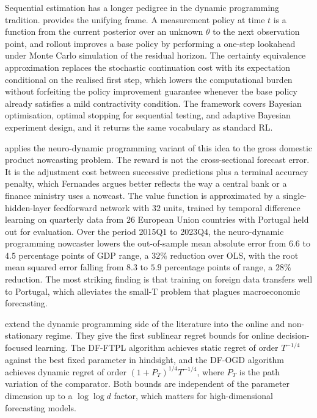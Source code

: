 Sequential estimation has a longer pedigree in the dynamic programming tradition.
\citet{BertsekasRollout2022} provides the unifying frame. A measurement policy at
time $t$ is a function from the current posterior over an unknown $\theta$ to the
next observation point, and rollout improves a base policy by performing a one-step
lookahead under Monte Carlo simulation of the residual horizon. The certainty
equivalence approximation replaces the stochastic continuation cost with its
expectation conditional on the realised first step, which lowers the computational
burden without forfeiting the policy improvement guarantee whenever the base policy
already satisfies a mild contractivity condition. The framework covers Bayesian
optimisation, optimal stopping for sequential testing, and adaptive Bayesian
experiment design, and it returns the same vocabulary as standard RL.

\citet{Fernandes2024} applies the neuro-dynamic programming variant of this idea to
the gross domestic product nowcasting problem. The reward is not the cross-sectional
forecast error. It is the adjustment cost between successive predictions plus a
terminal accuracy penalty, which Fernandes argues better reflects the way a central
bank or a finance ministry uses a nowcast. The value function is approximated by a
single-hidden-layer feedforward network with $32$ units, trained by temporal
difference learning on quarterly data from $26$ European Union countries with
Portugal held out for evaluation. Over the period 2015Q1 to 2023Q4, the neuro-dynamic
programming nowcaster lowers the out-of-sample mean absolute error from $6.6$ to
$4.5$ percentage points of GDP range, a $32\%$ reduction over OLS, with the root
mean squared error falling from $8.3$ to $5.9$ percentage points of range, a $28\%$
reduction. The most striking finding is that training on foreign data transfers well
to Portugal, which alleviates the small-T problem that plagues macroeconomic
forecasting.

\citet{BenAmeur2025} extend the dynamic programming side of the literature into the
online and non-stationary regime. They give the first sublinear regret bounds for
online decision-focused learning. The DF-FTPL algorithm achieves static regret of
order $T^{-1/4}$ against the best fixed parameter in hindsight, and the DF-OGD
algorithm achieves dynamic regret of order $(1 + P_T)^{1/4} T^{-1/4}$, where $P_T$
is the path variation of the comparator. Both bounds are independent of the
parameter dimension up to a $\log \log d$ factor, which matters for high-dimensional
forecasting models.

